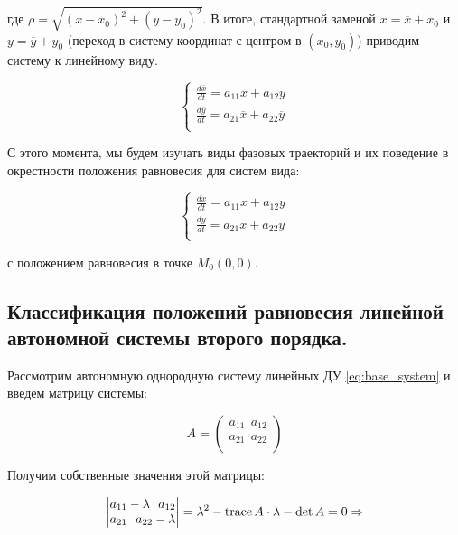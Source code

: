 где $\rho = \sqrt{(x - x_0)^2 + (y - y_0)^2}$. В итоге, стандартной заменой $x = \overline{x} + x_0$ и $y = \overline{y} + y_0$ (переход в систему координат с центром в $(x_0, y_0)$) приводим систему к линейному виду.

\begin{equation}
  \begin{cases}
    \frac{d \overline{x}}{d t} = a_{11} \overline{x} + a_{12} \overline{y} \\
    \frac{d \overline{y}}{d t} = a_{21} \overline{x} + a_{22} \overline{y} \\        
  \end{cases}
\end{equation}

С этого момента, мы будем изучать виды фазовых траекторий и их поведение в окрестности положения равновесия для систем вида:

\begin{equation} \label{eq:base_system}
	\begin{cases}
		\frac{d x}{d t} = a_{11} x + a_{12} y \\
		\frac{d y}{d t} = a_{21} x + a_{22} y \\        
	\end{cases}
\end{equation}

с положением равновесия в точке $M_0(0, 0)$.

\subsection{Классификация положений равновесия линейной автономной системы второго порядка.}

Рассмотрим автономную однородную систему линейных ДУ \eqref{eq:base_system} и введем матрицу системы:

\begin{equation}
	A = 
	\begin{pmatrix}
		a_{11} ~~ a_{12} \\
		a_{21} ~~ a_{22} \\
	\end{pmatrix}
\end{equation}

Получим собственные значения этой матрицы:

\begin{equation}
	\begin{vmatrix}
		a_{11} - \lambda ~~ a_{12} \\
		a_{21} ~~ a_{22} - \lambda \\
	\end{vmatrix} = 
	\lambda^2 - \operatorname{trace} A \cdot \lambda - \det A = 0 \Rightarrow
\end{equation}

